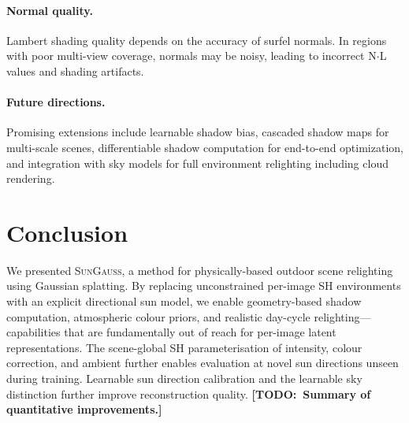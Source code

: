 \documentclass[conference]{IEEEtran}
\newcommand{\todo}[1]{{\color{red}\textbf{[TODO:~#1]}}}
\newcommand{\ours}{\textsc{SunGauss}}
\begin{document}
\paragraph{Normal quality.}
Lambert shading quality depends on the accuracy of surfel normals.
In regions with poor multi-view coverage, normals may be noisy, leading to incorrect N$\cdot$L values and shading artifacts.

\paragraph{Future directions.}
Promising extensions include learnable shadow bias, cascaded shadow maps for multi-scale scenes, differentiable shadow computation for end-to-end optimization, and integration with sky models for full environment relighting including cloud rendering.

\section{Conclusion}
\label{sec:conclusion}

We presented \ours{}, a method for physically-based outdoor scene relighting using Gaussian splatting.
By replacing unconstrained per-image SH environments with an explicit directional sun model, we enable geometry-based shadow computation, atmospheric colour priors, and realistic day-cycle relighting---capabilities that are fundamentally out of reach for per-image latent representations.
The scene-global SH parameterisation of intensity, colour correction, and ambient further enables evaluation at novel sun directions unseen during training.
Learnable sun direction calibration and the learnable sky distinction further improve reconstruction quality.
\todo{Summary of quantitative improvements.}
\end{document}
